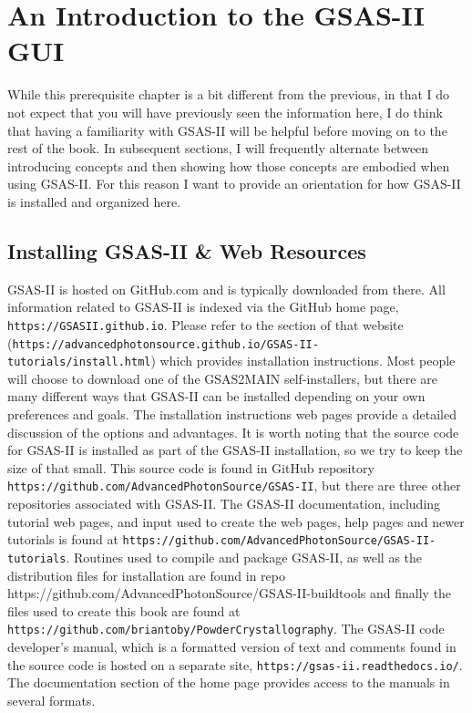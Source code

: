 \chapter{An Introduction to the GSAS-II GUI}
\label{Chap:GSASIIintro}

While this prerequisite chapter is a bit different from the previous, in that I do not expect that you will have previously seen the information here, I do think that having a familiarity with GSAS-II will be helpful before moving on to the rest of the book. In subsequent sections, I will frequently alternate between introducing concepts and then showing how those concepts are embodied when using GSAS-II. For this reason I want to provide an orientation for how GSAS-II is installed and organized here.

\section{Installing GSAS-II \& Web Resources}
GSAS-II is hosted on GitHub.com and is typically downloaded from there. All information related to GSAS-II is indexed via the GitHub home page, \texttt{https://GSASII.github.io}. Please refer to the section of that website (\texttt{https://advancedphotonsource.github.io/GSAS-II-tutorials/install.html}) which provides installation instructions. Most people will choose to download one of the GSAS2MAIN self-installers, but there are many different ways that GSAS-II can be installed depending on your own preferences and goals. The installation instructions web pages provide a detailed  discussion of the options and advantages. It is worth noting that the source code for GSAS-II is installed as part of the GSAS-II installation, so we try to keep the size of that small. This source code is found in GitHub repository  \texttt{https://github.com/AdvancedPhotonSource/GSAS-II}, but there are three other repositories associated with GSAS-II. The GSAS-II documentation, including tutorial web pages, and input used to create  the web pages, help pages and newer tutorials is found at \texttt{https://github.com/AdvancedPhotonSource/GSAS-II-tutorials}. Routines used to compile and package GSAS-II, as well as the distribution files for installation are found in repo https://github.com/AdvancedPhotonSource/GSAS-II-buildtools and finally the files used to create this book are found at \texttt{https://github.com/briantoby/PowderCrystallography}. The GSAS-II code developer's manual, which is a formatted version of text and comments found in the source code is hosted on a separate site, \texttt{https://gsas-ii.readthedocs.io/}. The documentation section of the home page provides access to the manuals in several formats.  


